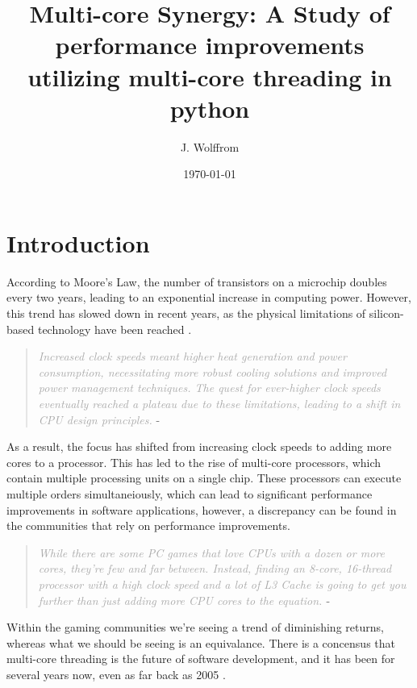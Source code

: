 \documentclass{article}
\title{Multi-core Synergy: A Study of performance improvements utilizing multi-core threading in python}
\author{J. Wolffrom}
\date{\today}
\begin{document}
 

\maketitle
\newpage

\begin{abstract}

\end{abstract}
\newpage

\tableofcontents

\newpage
\section{Introduction}

According to Moore's Law, the number of transistors on a microchip doubles every two years, leading to an exponential increase in computing power. 
However, this trend has slowed down in recent years, as the physical limitations of silicon-based technology have been reached \parencite{Mattson2014}.

\begin{quote}
    \textit{\textcolor{darkgray}{Increased clock speeds meant higher heat generation and power consumption, 
    necessitating more robust cooling solutions and improved power management techniques. 
    The quest for ever-higher clock speeds eventually reached a plateau due to these limitations, leading to a shift in CPU design principles.}} 
    - \parencite{mscodes} 
\end{quote}

As a result, the focus has shifted from increasing clock speeds to adding more cores to a processor. This has led to the rise of multi-core processors, which contain multiple processing units on a single chip. 
These processors can execute multiple orders simultaneiously, which can lead to significant performance improvements in software applications, however, a discrepancy can be found in the communities that rely on performance improvements.

\begin{quote}
    \textit{\textcolor{darkgray}{While there are some PC games that love CPUs with a dozen or more cores, they’re few and far between. 
    Instead, finding an 8-core, 16-thread processor with a high clock speed and a lot of L3 Cache is going to get you further than just adding more CPU cores to the equation. }} 
    - \parencite{Thomas2025}
\end{quote}

Within the gaming communities we're seeing a trend of diminishing returns, whereas what we should be seeing is an equivalance. There is a concensus that multi-core threading is the future of software development, and it has been for several years now, even as far back as 2005 \parencite{mscodes}.
\end{document}
